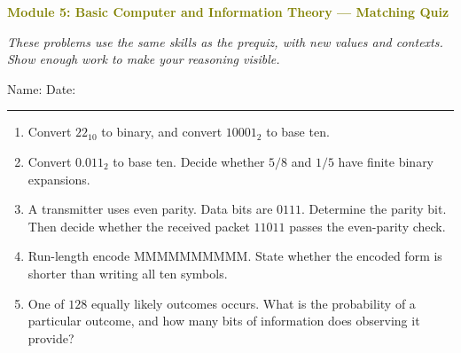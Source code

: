 \documentclass[11pt]{article}
\newcommand{\quizhead}[2]{%
  \clearpage
  {\Large\bfseries\textcolor{olive}{Module #1: #2 — Matching Quiz}}\par
  \textit{These problems use the same skills as the prequiz, with new values and contexts. Show enough work to make your reasoning visible.}\par
  Name: \hspace{2.6in} Date: \hspace{1.1in}\par
  \vspace{2pt}\textcolor{gold}{\rule{\linewidth}{1.2pt}}\par\smallskip
}
\newcommand{\workmed}{\par\vspace{0.62in}}
\begin{document}
\quizhead{5}{Basic Computer and Information Theory}
\begin{enumerate}
\item Convert \(22_{10}\) to binary, and convert \(10001_2\) to base ten.
\workmed

\item Convert \(0.011_2\) to base ten. Decide whether \(5/8\) and \(1/5\) have finite binary expansions.
\workmed

\item A transmitter uses even parity. Data bits are \(0111\). Determine the parity bit. Then decide whether the received packet \(11011\) passes the even-parity check.
\workmed

\item Run-length encode \(\text{MMMMMMMMMM}\). State whether the encoded form is shorter than writing all ten symbols.
\workmed

\item One of \(128\) equally likely outcomes occurs. What is the probability of a particular outcome, and how many bits of information does observing it provide?
\workmed
\end{enumerate}
\end{document}
